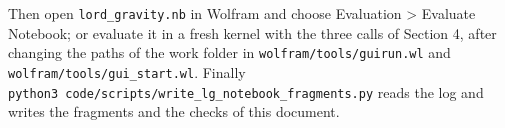\documentclass[
  10pt,
]{article}
\begin{document}
Then open \texttt{lord\_gravity.nb} in Wolfram and choose Evaluation
\textgreater{} Evaluate Notebook; or evaluate it in a fresh kernel with
the three calls of Section 4, after changing the paths of the work
folder in \texttt{wolfram/tools/guirun.wl} and
\texttt{wolfram/tools/gui\_start.wl}. Finally
\texttt{python3\ code/scripts/write\_lg\_notebook\_fragments.py} reads
the log and writes the fragments and the checks of this document.
\end{document}
